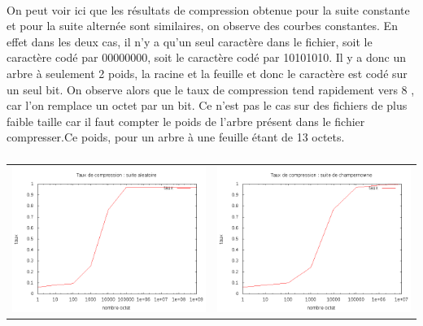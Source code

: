 \documentclass{report}
\begin{document}
\paragraph*{}
On peut voir ici que les  résultats de compression obtenue pour la suite constante et pour la suite alternée sont similaires, on observe des courbes constantes. En effet dans les deux cas, il n'y a qu'un seul caractère dans le fichier, soit le caractère codé par 00000000, soit le caractère codé par 10101010. Il y a donc un arbre à seulement 2 poids, la racine et la feuille et donc le caractère est codé sur un seul bit. On observe alors que le taux de compression tend rapidement vers 8 , car l'on remplace un octet par un bit. Ce n'est pas le cas sur des fichiers de plus faible taille car il faut compter le poids de l'arbre présent dans le fichier compresser.Ce poids, pour un arbre à une feuille étant de 13 octets.
\subparagraph*{}
\hspace{-2cm}\begin{tabular}{l | l}
\includegraphics[width=7cm]{aleaH.png} & 
\includegraphics[width=7cm]{champH.png}
\end{tabular}
\end{document}
